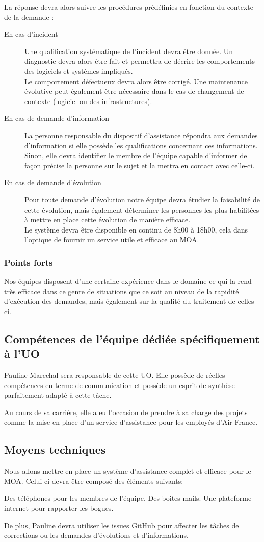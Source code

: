 La réponse devra alors suivre les procédures prédéfinies en fonction du contexte de la demande :
\begin{description}
	\item[En cas d'incident] Une qualification systématique de l’incident devra être donnée. Un diagnostic devra alors être fait et permettra de décrire les comportements des logiciels et systèmes impliqués.~\\
	Le comportement défectueux devra alors être corrigé. Une maintenance évolutive peut également être nécessaire dans le cas de changement de contexte (logiciel ou des infrastructures).
	\item[En cas de demande d'information] La personne responsable du dispositif d’assistance répondra aux demandes d’information si elle possède les qualifications concernant ces informations. Sinon, elle devra identifier le membre de l’équipe capable d’informer de façon précise la personne sur le sujet et  la mettra en contact avec celle-ci.
	\item[En cas de demande d'évolution] Pour toute demande d’évolution notre équipe devra étudier la faisabilité de cette évolution, mais également déterminer les personnes les plus habilitées à mettre en place cette évolution de manière efficace.~\\	
	Le système devra être disponible en continu de 8h00 à 18h00, cela dans l’optique de fournir un service utile et efficace au MOA.		
\end{description}
	

	\subsubsection{Points forts}
	Nos équipes disposent d’une certaine expérience dans le domaine ce qui la rend très efficace dans ce genre de situations que ce soit au niveau de la rapidité d’exécution des demandes, mais également sur la qualité du traitement de celles-ci.
	
	\subsection{Compétences de l'équipe dédiée spécifiquement à l'UO}	
	Pauline Marechal sera responsable de cette UO. Elle possède de réelles compétences en terme de communication et possède un esprit de synthèse parfaitement adapté à cette tâche.
	
	Au cours de sa carrière, elle a eu l’occasion de prendre à sa charge des projets comme la mise en place d’un service d’assistance pour les employés d’Air France.
	
	\subsection{Moyens techniques}
	Nous allons mettre en place un système d'assistance complet et efficace pour le MOA. Celui-ci devra être composé des éléments suivants:
	
	Des téléphones pour les membres de l’équipe.
	Des boites mails.
	Une plateforme internet pour rapporter les bogues.
	
	De plus, Pauline devra utiliser les issues GitHub pour affecter les tâches de corrections ou les demandes d’évolutions et d’informations.